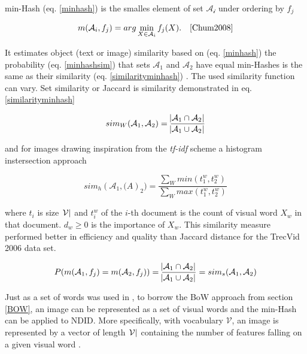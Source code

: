 \documentclass[english,12pt,a4paper,pdftex,elec,utf8]{aaltothesis}
\begin{document}
min-Hash (eq. \ref{minhash}) is the smalles element of set $\mathcal{A_i}$ under ordering by $f_j$

\begin{equation}\label{minhash}
m(\mathcal{A}_i,f_j)= arg \min_{X \in \mathcal{A}_i}f_j(X). \quad \cite{Chum2008}
\end{equation}

It estimates object (text or image) similarity based on (eq. \ref{minhash}) the probability (eq. \ref{minhashsim}) that sets $\mathcal{A}_1$ and $\mathcal{A}_2$ have equal min-Hashes is the same as their similarity (eq. \ref{similarityminhash}) \cite{Chum2008}. The used similarity function can vary. Set similarity or Jaccard is similarity demonstrated in eq. \ref{similarityminhash}

\begin{equation}\label{similarityminhash}
sim_W(\mathcal{A}_1,\mathcal{A}_2) = \frac{\abs{\mathcal{A}_1 \cap \mathcal{A}_2}}{\abs{\mathcal{A}_1 \cup \mathcal{A}_2}}
\end{equation}

 and for images drawing inspiration from the \emph{tf-idf} scheme a histogram instersection approach

\begin{equation}\label{similarityminhashimages}
sim_h(\mathcal{A}_1, \mathcal(A)_2)=\frac{\sum_W min(t^w_1,t^w_2)}{\sum_W max(t^w_1,t^w_2)}
\end{equation}

where $t_i$ is size $\abs{\mathcal{V}}$ and $t_i^w$ of the $i$-th document is the count of visual word $X_w$ in that document. $d_w \geq 0$ is the importance of $X_w$. This similarity measure performed better in efficiency and quality than Jaccard distance for the TrecVid 2006 data set. \cite{Chum2008}

\begin{equation}\label{minhashsim}
P(m(\mathcal{A}_1,f_j) = m(\mathcal{A}_2,f_j)) = \frac{\abs{\mathcal{A}_1 \cap \mathcal{A}_2}}{\abs{\mathcal{A}_1 \cup \mathcal{A}_2}} = sim_s(\mathcal{A}_1, \mathcal{A}_2)
\end{equation}

Just as a set of words was used in \cite{Broder1997}, to borrow the BoW approach from section \ref{BOW}, an image can be represented as a set of visual words and the min-Hash can be applied to NDID. More specifically, with vocabulary $\mathcal{V}$, an image is represented by a vector of length $\abs{\mathcal{V}}$ containing the number of features falling on a given visual word \cite{Chum2008}.
\end{document}
